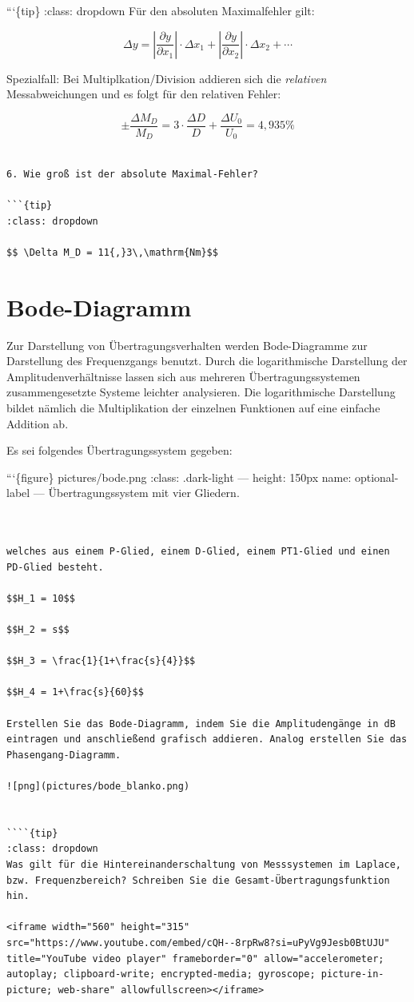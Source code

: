 \documentclass[
]{book}
\begin{document}
```\{tip\} :class: dropdown Für den absoluten Maximalfehler gilt:

\[\Delta y = \left| \frac{\partial y}{\partial x_1} \right| \cdot \Delta x_1+ \left|\frac{\partial y}{\partial x_2} \right| \cdot \Delta x_2 + \cdots\]

Spezialfall: Bei Multiplkation/Division addieren sich die \emph{relativen} Messabweichungen und es folgt für den relativen Fehler:

\[\pm \frac{\Delta M_D}{M_D} = 3 \cdot \frac{\Delta D}{D} + \frac{\Delta U_0}{U_0} = 4{,}935\%\]

\begin{verbatim}

6. Wie groß ist der absolute Maximal-Fehler?

```{tip}
:class: dropdown

$$ \Delta M_D = 11{,}3\,\mathrm{Nm}$$
\end{verbatim}

\section{Bode-Diagramm}\label{bode-diagramm}

Zur Darstellung von Übertragungsverhalten werden Bode-Diagramme zur Darstellung des Frequenzgangs benutzt. Durch die logarithmische Darstellung der Amplitudenverhältnisse lassen sich aus mehreren Übertragungssystemen zusammengesetzte Systeme leichter analysieren. Die logarithmische Darstellung bildet nämlich die Multiplikation der einzelnen Funktionen auf eine einfache Addition ab.

Es sei folgendes Übertragungssystem gegeben:

```\{figure\} pictures/bode.png :class: .dark-light --- height: 150px name: optional-label --- Übertragungssystem mit vier Gliedern.

\begin{verbatim}


welches aus einem P-Glied, einem D-Glied, einem PT1-Glied und einen PD-Glied besteht. 

$$H_1 = 10$$

$$H_2 = s$$

$$H_3 = \frac{1}{1+\frac{s}{4}}$$

$$H_4 = 1+\frac{s}{60}$$

Erstellen Sie das Bode-Diagramm, indem Sie die Amplitudengänge in dB eintragen und anschließend grafisch addieren. Analog erstellen Sie das Phasengang-Diagramm. 

![png](pictures/bode_blanko.png)


````{tip}
:class: dropdown
Was gilt für die Hintereinanderschaltung von Messsystemen im Laplace, bzw. Frequenzbereich? Schreiben Sie die Gesamt-Übertragungsfunktion hin.

<iframe width="560" height="315" src="https://www.youtube.com/embed/cQH--8rpRw8?si=uPyVg9Jesb0BtUJU" title="YouTube video player" frameborder="0" allow="accelerometer; autoplay; clipboard-write; encrypted-media; gyroscope; picture-in-picture; web-share" allowfullscreen></iframe>
\end{verbatim}
\end{document}

